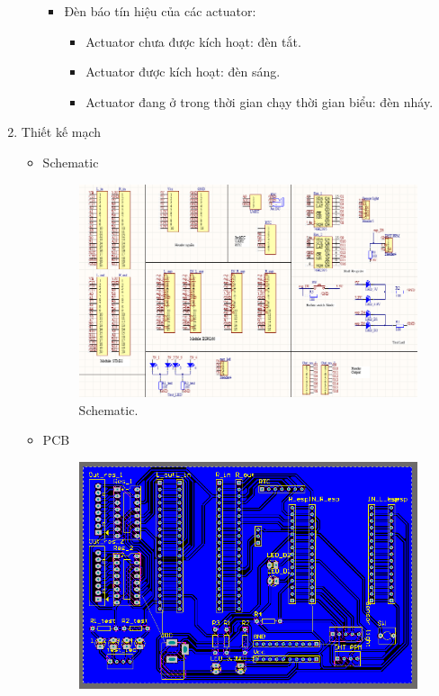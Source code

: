 \documentclass[a4paper,12pt,oneside]{article}
\begin{document}
\begin{enumerate}
\begin{itemize}
\begin{itemize}
\begin{itemize}
		\end{itemize}
		\item Đèn báo tín hiệu của các actuator:
		\begin{itemize}
		\item Actuator chưa được kích hoạt: đèn tắt.
		\item Actuator được kích hoạt: đèn sáng.
		\item Actuator đang ở trong  thời gian chạy thời gian biểu: đèn nháy.
		\end{itemize}
		\end{itemize}
	\end{itemize}
	\item Thiết kế mạch
	\begin{itemize}
		\item Schematic
    	\begin{landscape}
			\begin{figure}[H]
			\centering
			\includegraphics[scale=1]{hinh/schematic.PNG}
			\caption{Schematic.}
			\end{figure}
      \end{landscape}
		\item PCB
			\begin{figure}[H]
			\centering
			\includegraphics[scale=.9]{hinh/pcb_board.PNG}

\end{figure}
\end{itemize}
\end{enumerate}
\end{document}
